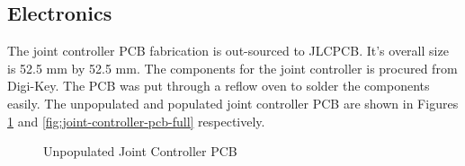 \documentclass[english]{upeeei}
\begin{document}
\subsection{Electronics}

The joint controller PCB fabrication is out-sourced to JLCPCB. It's overall size is 52.5 mm by 52.5 mm. The components for the joint controller is procured from Digi-Key. The PCB was put through a reflow oven to solder the components easily. The unpopulated and populated joint controller PCB are shown in Figures \ref{fig:joint-controller-pcb} and \ref{fig:joint-controller-pcb-full} respectively.

\begin{figure}[H]
\begin{centering}
\par\end{centering}
\begin{centering}
\par\end{centering}
\caption{Unpopulated Joint Controller PCB\label{fig:joint-controller-pcb}}
\end{figure}
\end{document}
